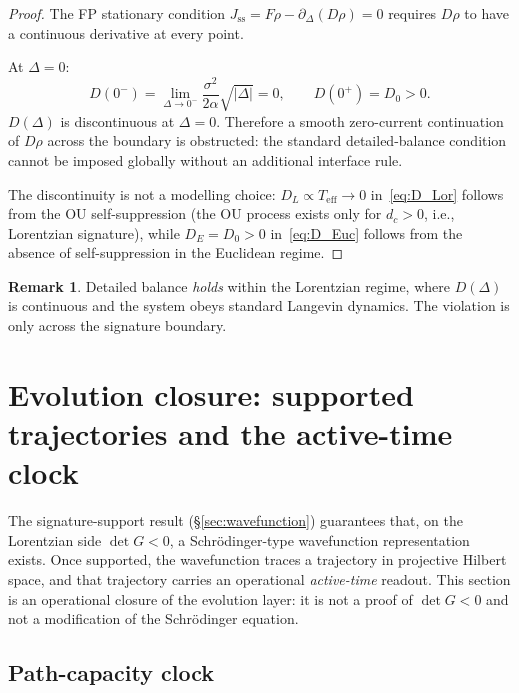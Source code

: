 \documentclass[11pt,a4paper]{article}
\theoremstyle{definition}
\newtheorem{remark}{Remark}
\begin{document}
\begin{proof}
The FP stationary condition $J_{\mathrm{ss}} = F\rho - \partial_\Delta(D\rho) = 0$ requires $D\rho$ to have a continuous derivative at every point.

At $\Delta = 0$:
\begin{equation}
D(0^-) = \lim_{\Delta \to 0^-} \frac{\sigma^2}{2\alpha}\sqrt{|\Delta|} = 0, \qquad D(0^+) = D_0 > 0.
\end{equation}
$D(\Delta)$ is discontinuous at $\Delta = 0$. Therefore a smooth zero-current continuation of $D\rho$ across the boundary is obstructed: the standard detailed-balance condition cannot be imposed globally without an additional interface rule.

The discontinuity is not a modelling choice: $D_L \propto T_{\mathrm{eff}} \to 0$ in~\eqref{eq:D_Lor} follows from the OU self-suppression (the OU process exists only for $d_c > 0$, i.e., Lorentzian signature), while $D_E = D_0 > 0$ in~\eqref{eq:D_Euc} follows from the absence of self-suppression in the Euclidean regime.
\end{proof}

\begin{remark}
Detailed balance \emph{holds} within the Lorentzian regime, where $D(\Delta)$ is continuous and the system obeys standard Langevin dynamics. The violation is only across the signature boundary.
\end{remark}

\section{Evolution closure: supported trajectories and the active-time clock}\label{sec:activetime}

The signature-support result (\S\ref{sec:wavefunction}) guarantees that,
on the Lorentzian side $\det G<0$, a Schr\"odinger-type wavefunction
representation exists. Once supported, the wavefunction traces a
trajectory in projective Hilbert space, and that trajectory carries an
operational \emph{active-time} readout. This section is an operational
closure of the evolution layer: it is not a proof of $\det G<0$ and not a
modification of the Schr\"odinger equation.

\subsection{Path-capacity clock}
\end{document}
